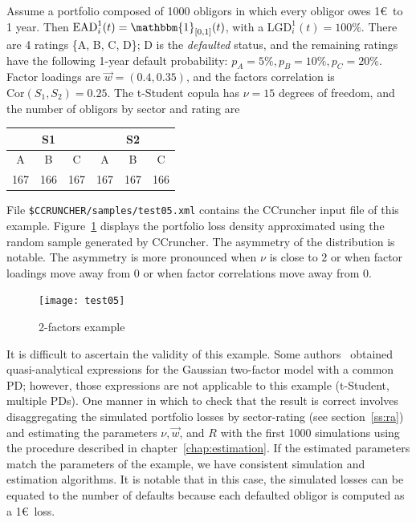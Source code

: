 \documentclass[11pt,fleqn]{book} %
\begin{document}
\begin{example}[2 factors]
	\label{ex:test05}
	Assume a portfolio composed of \num{1000} obligors in which every obligor 
	owes 1\euro\ to 1 year. Then $\text{EAD}_i^1(t) = \mathbbm{1}_{[0,1]}(t)$, 
	with a $\text{LGD}_i^1(t)=100\%$. There are 4 ratings \{A, B, C, D\}; D is 
	the \emph{defaulted} status, and the remaining ratings have the following 
	1-year default probability: $p_A = 5\%, p_B = 10\%, p_C = 20\%$. Factor 
	loadings are $\vec{w} = (0.4, 0.35)$, and the factors correlation is 
	$\text{Cor}(S_1,S_2) = 0.25$. The t-Student copula has $\nu=15$ degrees
	of freedom, and the number of obligors by sector and rating are

	\hspace*{1cm}
	\begin{tabular}{|c|c|c||c|c|c|}
		\hline
		\multicolumn{3}{|c||}{S1} & \multicolumn{3}{|c|}{S2} \\
		\hline
		A & B & C & A & B & C \\
		\hline
		167 & 166 & 167 & 167 & 167 & 166 \\
		\hline
	\end{tabular}

	File \texttt{\$CCRUNCHER/samples/test05.xml} contains the CCruncher input
	file of this example. Figure~\ref{fig:test05} displays the portfolio
	loss density approximated using the random sample generated by CCruncher.
	The asymmetry of the distribution is notable. The asymmetry is more 
	pronounced when $\nu$ is close to $2$ or when factor loadings move away 
	from $0$ or when factor correlations move away from $0$.
	\begin{figure}[!ht]
		\centering
		\texttt{[image: test05]}
		\caption{2-factors example}
		\label{fig:test05}
	\end{figure}

	It is difficult to ascertain the validity of this example. Some 
	authors~\cite{cespedes:2002} obtained quasi-analytical expressions for 
	the Gaussian two-factor model with a common PD; however, those expressions 
	are not applicable to this example (t-Student, multiple PDs). One manner in 
	which to check that the result is correct involves disaggregating the 
	simulated portfolio losses by sector-rating (see section~\ref{ss:ra}) and 
	estimating the parameters $\nu, \vec{w}$, and $R$ with the first \num{1000} 
	simulations using the procedure described in chapter~\ref{chap:estimation}. 
	If the estimated parameters match the parameters of the example, we have
	consistent simulation and estimation algorithms. It is notable that in 
	this case, the simulated losses can be equated to the number of defaults 
	because each defaulted obligor is computed as a 1\euro\ loss.
\end{example}
\end{document}
